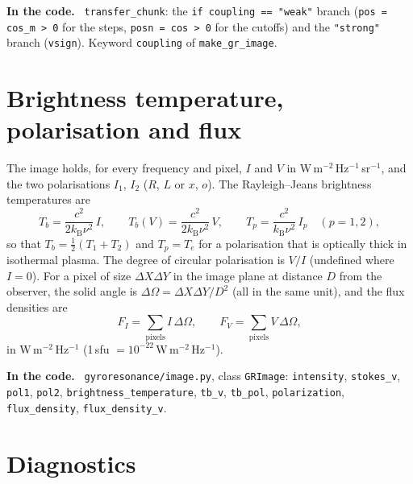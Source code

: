 \documentclass[11pt,a4paper]{article}
\newcommand{\code}[1]{\texttt{#1}}
\newcommand{\kB}{k_\mathrm{B}}
\newenvironment{incode}{\par\smallskip\noindent\begin{minipage}{\linewidth}\small\color{accent!80!black}\textbf{In the code.}~}{\end{minipage}\par\smallskip}
\begin{document}
\begin{incode}
\code{transfer\_chunk}: the \code{if coupling == "weak"} branch (\code{pos = cos\_m > 0} for
the steps, \code{posn = cos > 0} for the cutoffs) and the \code{"strong"} branch
(\code{vsign}). Keyword \code{coupling} of \code{make\_gr\_image}.
\end{incode}

\section{Brightness temperature, polarisation and flux}\label{sec:output}

The image holds, for every frequency and pixel, $I$ and $V$ in
W\,m$^{-2}$\,Hz$^{-1}$\,sr$^{-1}$, and the two polarisations $I_1$, $I_2$ ($R$, $L$ or $x$, $o$).
The Rayleigh--Jeans brightness temperatures are
\begin{equation}
  T_b=\frac{c^2}{2\kB\nu^2}\,I,\qquad
  T_b(V)=\frac{c^2}{2\kB\nu^2}\,V,\qquad
  T_p=\frac{c^2}{\kB\nu^2}\,I_p\quad(p=1,2),
\end{equation}
so that $T_b=\tfrac12(T_1+T_2)$ and $T_p=T_e$ for a polarisation that is optically thick in
isothermal plasma. The degree of circular polarisation is $V/I$ (undefined where $I=0$).
For a pixel of size $\Delta X\Delta Y$ in the image plane at distance $D$ from the observer,
the solid angle is $\Delta\Omega=\Delta X\Delta Y/D^2$ (all in the same unit), and the flux
densities are
\begin{equation}
  F_I=\sum_\text{pixels}I\,\Delta\Omega,\qquad F_V=\sum_\text{pixels}V\,\Delta\Omega,
\end{equation}
in W\,m$^{-2}$\,Hz$^{-1}$ (1\,sfu $=10^{-22}$\,W\,m$^{-2}$\,Hz$^{-1}$).

\begin{incode}
\code{gyroresonance/image.py}, class \code{GRImage}: \code{intensity}, \code{stokes\_v},
\code{pol1}, \code{pol2}, \code{brightness\_temperature}, \code{tb\_v}, \code{tb\_pol},
\code{polarization}, \code{flux\_density}, \code{flux\_density\_v}.
\end{incode}

\section{Diagnostics}\label{sec:diag}
\end{document}
